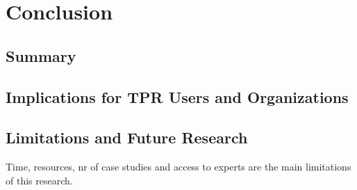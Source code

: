 
\newpage
\section{Conclusion}


\subsection{Summary}




\subsection{Implications for \ac{TPR} Users and Organizations}


\subsection{Limitations and Future Research}

Time, resources, nr of case studies and access to experts are the main limitations of this research.

